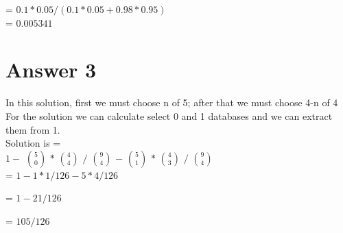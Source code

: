 \documentclass[12pt]{article}
\begin{document}
= $0.1 * 0.05 / (0.1 * 0.05 + 0.98 * 0.95)$\\

= $0.005341$

\section*{Answer 3}

In this solution, first we must choose n of 5; after that we must choose 4-n of 4 \\
For the solution we can calculate select 0 and 1 databases and we can extract them from 1.\\

Solution is = \\

$1 -$  ${5}\choose{0}$ $*$ $ {4}\choose{4}$ $/$  ${9}\choose{4}$ $-$ ${5}\choose{1}$ $*$ $ {4}\choose{3}$ $/$  ${9}\choose{4}$\\

= $1 - 1 * 1 / 126 - 5 * 4 / 126$

= $1 - 21/126$

= $105/126$ 
\end{document}
